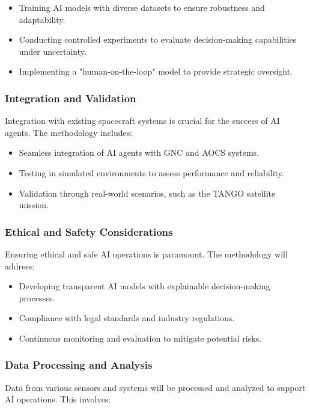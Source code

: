 \documentclass[a4paper, 11pt]{article}
\begin{document}
\begin{itemize}
    \item Training AI models with diverse datasets to ensure robustness and adaptability.
    \item Conducting controlled experiments to evaluate decision-making capabilities under uncertainty.
    \item Implementing a "human-on-the-loop" model to provide strategic oversight.
\end{itemize}

\subsubsection{Integration and Validation}

Integration with existing spacecraft systems is crucial for the success of AI agents. The methodology includes:

\begin{itemize}
    \item Seamless integration of AI agents with GNC and AOCS systems.
    \item Testing in simulated environments to assess performance and reliability.
    \item Validation through real-world scenarios, such as the TANGO satellite mission.
\end{itemize}

\subsubsection{Ethical and Safety Considerations}

Ensuring ethical and safe AI operations is paramount. The methodology will address:

\begin{itemize}
    \item Developing transparent AI models with explainable decision-making processes.
    \item Compliance with legal standards and industry regulations.
    \item Continuous monitoring and evaluation to mitigate potential risks.
\end{itemize}

\subsubsection{Data Processing and Analysis}

Data from various sensors and systems will be processed and analyzed to support AI operations. This involves:
\end{document}
